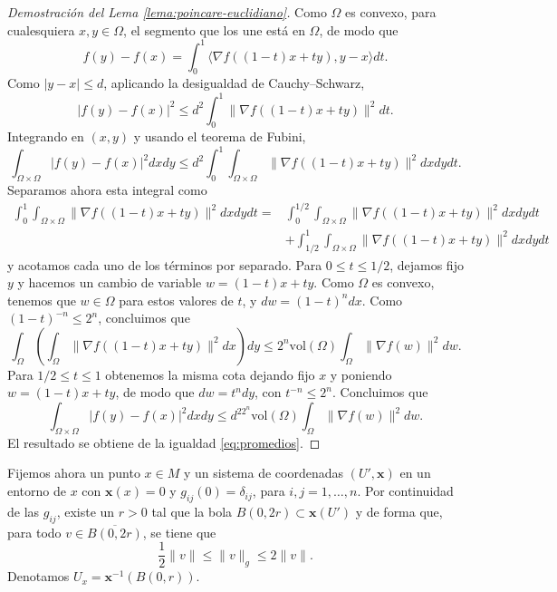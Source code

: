\documentclass[11pt,a4paper]{amsbook}
\theoremstyle{remark} \newtheorem{rmk}[subsection]{Observación}
\theoremstyle{definition} \newtheorem{defn}[subsection]{Definición}
\theoremstyle{definition} \newtheorem{ex}[subsection]{Ejemplo}
\theoremstyle{definition} \newtheorem{ej}[subsection]{Ejercicio}
\begin{document}
\begin{proof}[Demostración del Lema \ref{lema:poincare-euclidiano}]
  Como $\Omega$ es convexo, para cualesquiera $x,y \in \Omega$, el segmento que los une está en $\Omega$, de modo que
  \begin{equation*}
f(y)-f(x) = \int_0^1 \langle \nabla f((1-t)x + ty), y-x \rangle dt.
  \end{equation*}
Como $\lvert y-x \rvert \leq d$, aplicando la desigualdad de Cauchy--Schwarz,
\begin{equation*}
\lvert f(y)-f(x) \vert^2 \leq d^2 \int_0^1 \lVert \nabla f((1-t)x + ty) \rVert^2 dt.
\end{equation*}
Integrando en $(x,y)$ y usando el teorema de Fubini,
\begin{equation*}
\int_{\Omega \times \Omega} \lvert f(y)-f(x) \vert^2 dx dy \leq d^2 \int_0^1 \int_{\Omega \times \Omega} \lVert \nabla f((1-t)x + ty) \rVert^2 dx dy dt.
\end{equation*}
Separamos ahora esta integral como
\begin{align*}
\int_0^1 \int_{\Omega \times \Omega} \lVert \nabla f((1-t)x + ty) \rVert^2 dx dy dt = & \int_0^{1/2} \int_{\Omega \times \Omega} \lVert \nabla f((1-t)x + ty) \rVert^2 dx dy dt \\ & + \int_{1/2}^1 \int_{\Omega \times \Omega} \lVert \nabla f((1-t)x + ty) \rVert^2 dx dy dt
\end{align*}
y acotamos cada uno de los términos por separado.
Para $0\leq t \leq 1/2$, dejamos fijo $y$ y hacemos un cambio de variable $w=(1-t)x + ty$. Como $\Omega$ es convexo, tenemos que $w\in \Omega$ para estos valores de $t$, y $dw = (1-t)^n dx$. Como $(1-t)^{-n}\leq 2^n$, concluimos que
\begin{equation*}
\int_{\Omega} \left( \int_\Omega \lVert \nabla f((1-t)x + ty) \rVert^2 dx  \right) dy \leq 2^n \mathrm{vol}(\Omega) \int_{\Omega} \lVert \nabla f(w) \rVert^2 dw.
\end{equation*}
Para $1/2\leq t \leq 1$ obtenemos la misma cota dejando fijo $x$ y poniendo $w=(1-t)x + ty$, de modo que $dw = t^n dy$, con $t^{-n}\leq 2^n$. Concluimos que
\begin{equation*}
\int_{\Omega \times \Omega} \lvert f(y)-f(x) \vert^2 dx dy \leq d^22^n \mathrm{vol}(\Omega) \int_{\Omega} \lVert \nabla f(w) \rVert^2 dw.
\end{equation*}
El resultado se obtiene de la igualdad \eqref{eq:promedios}.
\end{proof}

Fijemos ahora un punto $x\in M$ y un sistema de coordenadas $(U',\bm{x})$ en un entorno de $x$ con $\bm{x}(x)=0$ y $g_{ij}(0)=\delta_{ij}$, para $i,j=1,\dots,n$. Por continuidad de las $g_{ij}$, existe un $r>0$ tal que la bola $B(0,2r)\subset \bm{x}(U')$ y de forma que, para todo $v \in \overline{B(0,2r)}$, se tiene que
\begin{equation*}
\frac{1}{2} \lVert v \rVert \leq \lVert v \rVert_g \leq 2\lVert v \rVert.
\end{equation*}
Denotamos $U_x=\bm{x}^{-1}(B(0,r))$.
\end{document}
